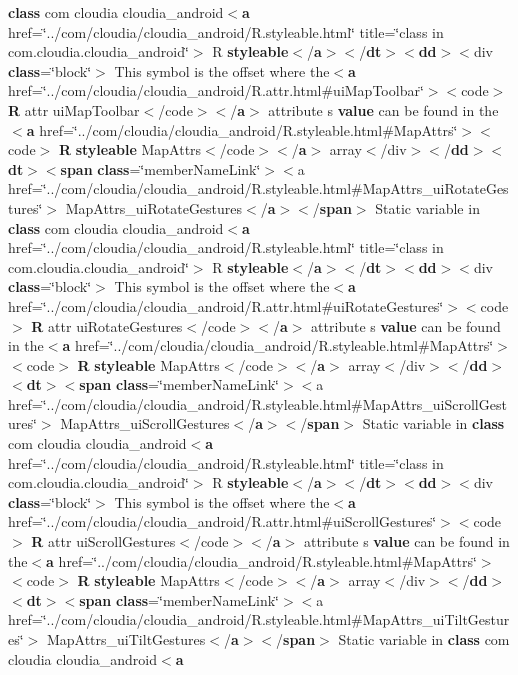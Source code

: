 {{\bf class} com cloudia cloudia\-\_\-android$<${\bf a} href=\char`\"{}../com/cloudia/cloudia\-\_\-android/R.\-styleable.\-html\char`\"{} title=\char`\"{}class in com.\-cloudia.\-cloudia\-\_\-android\char`\"{}$>$ R {\bf styleable}$<$/{\bf a}$>$$<$/{\bf dt}$>$$<${\bf dd}$>$$<$div {\bf class}=\char`\"{}block\char`\"{}$>$ This symbol is the offset where the$<${\bf a} href=\char`\"{}../com/cloudia/cloudia\-\_\-android/R.\-attr.\-html\#ui\-Map\-Toolbar\char`\"{}$>$$<$code$>$ {\bf R} attr ui\-Map\-Toolbar$<$/code$>$$<$/{\bf a}$>$ attribute s {\bf value} can be found in the$<${\bf a} href=\char`\"{}../com/cloudia/cloudia\-\_\-android/R.\-styleable.\-html\#Map\-Attrs\char`\"{}$>$$<$code$>$ {\bf R} {\bf styleable} Map\-Attrs$<$/code$>$$<$/{\bf a}$>$ array$<$/div$>$$<$/{\bf dd}$>$$<${\bf dt}$>$$<${\bf span} {\bf class}=\char`\"{}member\-Name\-Link\char`\"{}$>$$<$a href=\char`\"{}../com/cloudia/cloudia\-\_\-android/R.\-styleable.\-html\#Map\-Attrs\-\_\-ui\-Rotate\-Gestures\char`\"{}$>$ Map\-Attrs\-\_\-ui\-Rotate\-Gestures$<$/{\bf a}$>$$<$/{\bf span}$>$ Static variable in {\bf class} com cloudia cloudia\-\_\-android$<${\bf a} href=\char`\"{}../com/cloudia/cloudia\-\_\-android/R.\-styleable.\-html\char`\"{} title=\char`\"{}class in com.\-cloudia.\-cloudia\-\_\-android\char`\"{}$>$ R {\bf styleable}$<$/{\bf a}$>$$<$/{\bf dt}$>$$<${\bf dd}$>$$<$div {\bf class}=\char`\"{}block\char`\"{}$>$ This symbol is the offset where the$<${\bf a} href=\char`\"{}../com/cloudia/cloudia\-\_\-android/R.\-attr.\-html\#ui\-Rotate\-Gestures\char`\"{}$>$$<$code$>$ {\bf R} attr ui\-Rotate\-Gestures$<$/code$>$$<$/{\bf a}$>$ attribute s {\bf value} can be found in the$<${\bf a} href=\char`\"{}../com/cloudia/cloudia\-\_\-android/R.\-styleable.\-html\#Map\-Attrs\char`\"{}$>$$<$code$>$ {\bf R} {\bf styleable} Map\-Attrs$<$/code$>$$<$/{\bf a}$>$ array$<$/div$>$$<$/{\bf dd}$>$$<${\bf dt}$>$$<${\bf span} {\bf class}=\char`\"{}member\-Name\-Link\char`\"{}$>$$<$a href=\char`\"{}../com/cloudia/cloudia\-\_\-android/R.\-styleable.\-html\#Map\-Attrs\-\_\-ui\-Scroll\-Gestures\char`\"{}$>$ Map\-Attrs\-\_\-ui\-Scroll\-Gestures$<$/{\bf a}$>$$<$/{\bf span}$>$ Static variable in {\bf class} com cloudia cloudia\-\_\-android$<${\bf a} href=\char`\"{}../com/cloudia/cloudia\-\_\-android/R.\-styleable.\-html\char`\"{} title=\char`\"{}class in com.\-cloudia.\-cloudia\-\_\-android\char`\"{}$>$ R {\bf styleable}$<$/{\bf a}$>$$<$/{\bf dt}$>$$<${\bf dd}$>$$<$div {\bf class}=\char`\"{}block\char`\"{}$>$ This symbol is the offset where the$<${\bf a} href=\char`\"{}../com/cloudia/cloudia\-\_\-android/R.\-attr.\-html\#ui\-Scroll\-Gestures\char`\"{}$>$$<$code$>$ {\bf R} attr ui\-Scroll\-Gestures$<$/code$>$$<$/{\bf a}$>$ attribute s {\bf value} can be found in the$<${\bf a} href=\char`\"{}../com/cloudia/cloudia\-\_\-android/R.\-styleable.\-html\#Map\-Attrs\char`\"{}$>$$<$code$>$ {\bf R} {\bf styleable} Map\-Attrs$<$/code$>$$<$/{\bf a}$>$ array$<$/div$>$$<$/{\bf dd}$>$$<${\bf dt}$>$$<${\bf span} {\bf class}=\char`\"{}member\-Name\-Link\char`\"{}$>$$<$a href=\char`\"{}../com/cloudia/cloudia\-\_\-android/R.\-styleable.\-html\#Map\-Attrs\-\_\-ui\-Tilt\-Gestures\char`\"{}$>$ Map\-Attrs\-\_\-ui\-Tilt\-Gestures$<$/{\bf a}$>$$<$/{\bf span}$>$ Static variable in {\bf class} com cloudia cloudia\-\_\-android$<${\bf a} }
